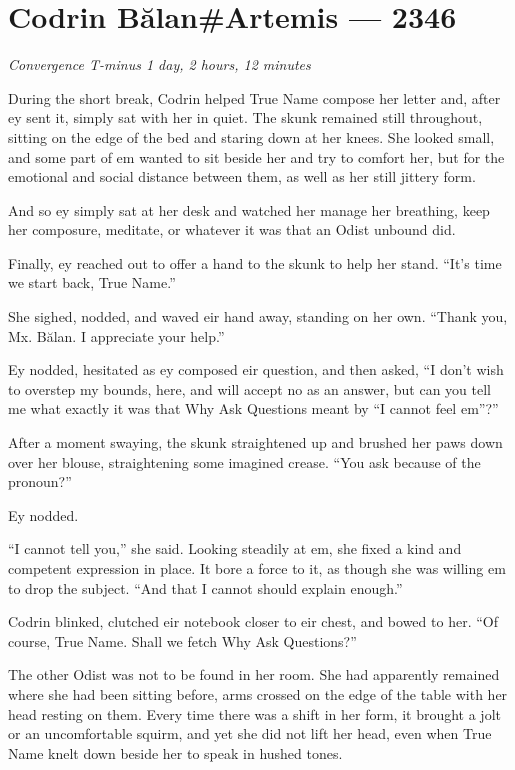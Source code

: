 \hypertarget{codrin-bux103lanartemis-2346}{%
\chapter{Codrin Bălan\#Artemis — 2346}\label{codrin-bux103lanartemis-2346}}

\begin{center}
\emph{Convergence T-minus 1 day, 2 hours, 12 minutes}
\end{center}

\noindent During the short break, Codrin helped True Name compose her letter and, after ey sent it, simply sat with her in quiet. The skunk remained still throughout, sitting on the edge of the bed and staring down at her knees. She looked small, and some part of em wanted to sit beside her and try to comfort her, but for the emotional and social distance between them, as well as her still jittery form.

And so ey simply sat at her desk and watched her manage her breathing, keep her composure, meditate, or whatever it was that an Odist unbound did.

Finally, ey reached out to offer a hand to the skunk to help her stand. ``It's time we start back, True Name.''

She sighed, nodded, and waved eir hand away, standing on her own. ``Thank you, Mx. Bălan. I appreciate your help.''

Ey nodded, hesitated as ey composed eir question, and then asked, ``I don't wish to overstep my bounds, here, and will accept no as an answer, but can you tell me what exactly it was that Why Ask Questions meant by ``I cannot feel em''?''

After a moment swaying, the skunk straightened up and brushed her paws down over her blouse, straightening some imagined crease. ``You ask because of the pronoun?''

Ey nodded.

``I cannot tell you,'' she said. Looking steadily at em, she fixed a kind and competent expression in place. It bore a force to it, as though she was willing em to drop the subject. ``And that I cannot should explain enough.''

Codrin blinked, clutched eir notebook closer to eir chest, and bowed to her. ``Of course, True Name. Shall we fetch Why Ask Questions?''

The other Odist was not to be found in her room. She had apparently remained where she had been sitting before, arms crossed on the edge of the table with her head resting on them. Every time there was a shift in her form, it brought a jolt or an uncomfortable squirm, and yet she did not lift her head, even when True Name knelt down beside her to speak in hushed tones.

